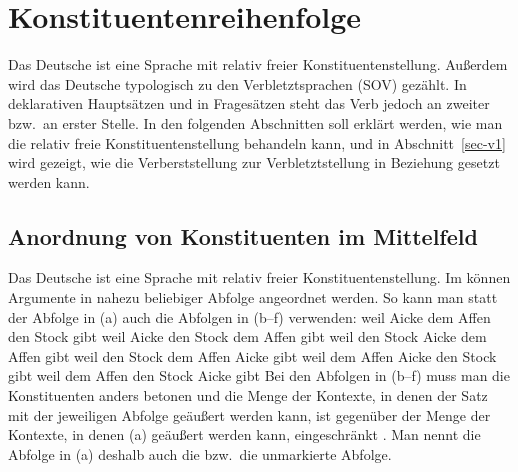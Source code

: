 
\chapter{Konstituentenreihenfolge}
\label{Kapitel-Konstituentenreihenfolge}

Das Deutsche ist eine Sprache mit relativ freier Konstituentenstellung.
Außerdem wird das Deutsche typologisch zu den Verbletztsprachen (SOV) gezählt.
In deklarativen Hauptsätzen und in Fragesätzen steht das Verb jedoch an zweiter
bzw.\ an erster Stelle. In den folgenden Abschnitten soll erklärt werden, wie man
die relativ freie Konstituentenstellung behandeln kann, und in Abschnitt~\ref{sec-v1}
wird gezeigt, wie die Verberststellung zur Verbletztstellung in Beziehung gesetzt werden
kann.

\section{Anordnung von Konstituenten im Mittelfeld}
\label{sec-mf}

Das Deutsche ist eine Sprache mit relativ freier Konstituentenstellung.
Im \mf können Argumente in nahezu beliebiger Abfolge angeordnet werden.
So kann man statt der Abfolge in (a) auch die Abfolgen in (b--f)
verwenden:
\eal
\label{bsp-perm-mf}
\ex
\label{ex-weil Aicke dem Affen den Stock gibt}
weil Aicke dem Affen den Stock gibt
\ex weil Aicke den Stock dem Affen gibt
\ex weil den Stock Aicke dem Affen gibt
\ex weil den Stock dem Affen Aicke gibt
\ex weil dem Affen Aicke den Stock gibt
\ex weil dem Affen den Stock Aicke gibt
\zl
Bei den Abfolgen in (b--f) muss man die Konstituenten anders betonen
und die Menge der Kontexte, in denen der Satz mit der jeweiligen Abfolge
geäußert werden kann, ist gegenüber der Menge der Kontexte, in denen (a)
geäußert werden kann, eingeschränkt \citep{Hoehle82a}. Man nennt die
Abfolge in (a) deshalb auch die  bzw.\ die unmarkierte
Abfolge.

